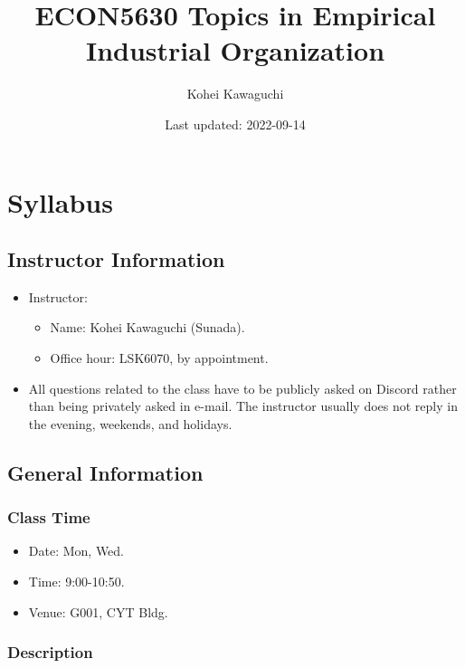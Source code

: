 \documentclass[
]{book}
\title{ECON5630 Topics in Empirical Industrial Organization}
\author{Kohei Kawaguchi}
\date{Last updated: 2022-09-14}
\providecommand{\tightlist}{%
  \setlength{\itemsep}{0pt}\setlength{\parskip}{0pt}}
\begin{document}
\maketitle

{
\setcounter{tocdepth}{1}
\tableofcontents
}
\hypertarget{syllabus}{%
\chapter{Syllabus}\label{syllabus}}

\hypertarget{instructor-information}{%
\section{Instructor Information}\label{instructor-information}}

\begin{itemize}
\tightlist
\item
  Instructor:

  \begin{itemize}
  \tightlist
  \item
    Name: Kohei Kawaguchi (Sunada).
  \item
    Office hour: LSK6070, by appointment.
  \end{itemize}
\item
  All questions related to the class have to be publicly asked on Discord rather than being privately asked in e-mail. The instructor usually does not reply in the evening, weekends, and holidays.
\end{itemize}

\hypertarget{general-information}{%
\section{General Information}\label{general-information}}

\hypertarget{class-time}{%
\subsection{Class Time}\label{class-time}}

\begin{itemize}
\tightlist
\item
  Date: Mon, Wed.
\item
  Time: 9:00-10:50.
\item
  Venue: G001, CYT Bldg.
\end{itemize}

\hypertarget{description}{%
\subsection{Description}\label{description}}
\end{document}
